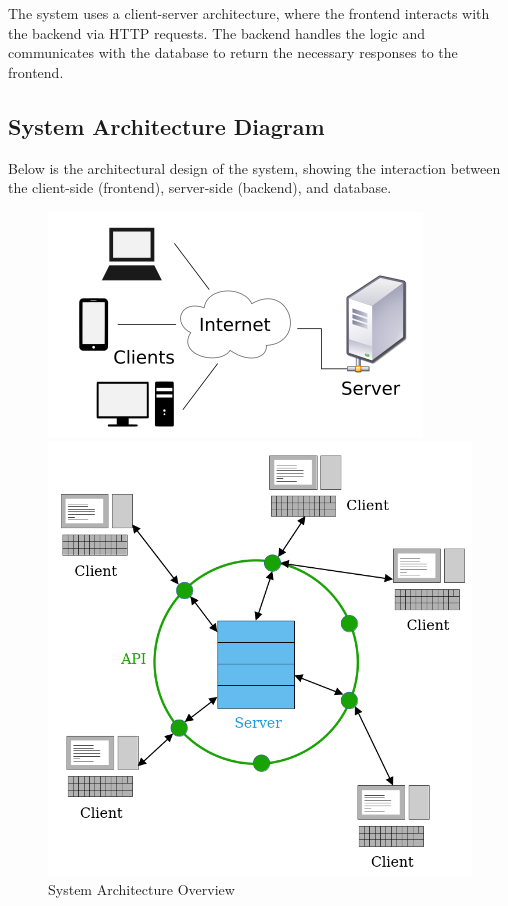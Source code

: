 \documentclass[a4paper,12pt]{report}
\begin{document}
The system uses a client-server architecture, where the frontend interacts with the backend via HTTP requests. The backend handles the logic and communicates with the database to return the necessary responses to the frontend.

\subsection{System Architecture Diagram}
Below is the architectural design of the system, showing the interaction between the client-side (frontend), server-side (backend), and database.

\begin{figure}[ht]
\centering
\begin{minipage}{0.45\textwidth}
    \centering
    \includegraphics[width=\linewidth]{../img/Client-Server.png}
    \caption{System Architecture Overview}
    \label{fig:system_architecture_1}
\end{minipage}%
\hfill
\begin{minipage}{0.45\textwidth}
    \centering
    \includegraphics[width=\linewidth]{../img/cli-server.png}

\end{minipage}
\end{figure}
\end{document}
